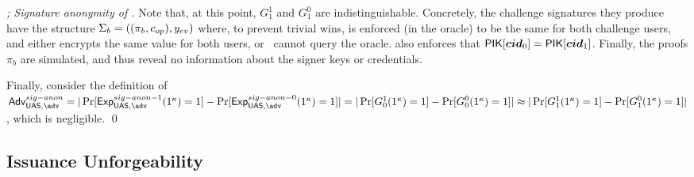 \begin{proof}[; Signature anonymity of \CUASGen]
  Note that, at this point, $G_1^1$ and $G_1^0$ are indistinguishable.
  Concretely, the challenge signatures they produce have the structure $\Sigma_b =
  ((\pi_b,c_{op}),y_{ev})$ where, to prevent trivial wins, \yeval is enforced
  (in the \SIGN oracle) to be the same for both challenge users, and \cinsp
  either encrypts the same value for both users, or \adv~cannot query the \OPEN
  oracle. \SIGN also enforces that $\mathsf{P}\mathsf{IK}[\boldsymbol{cid}_0] = \mathsf{P}\mathsf{IK}[\boldsymbol{cid}_1]$. Finally,
  the proofs $\pi_b$ are simulated, and thus reveal no information about the
  signer keys or credentials.

  Finally, consider the definition of $\AdvSigAnon=|\Pr\lbrack
  \ExpSigAnono(1^\secpar)=1\rbrack-\Pr\lbrack\ExpSigAnonz(1^\secpar)=1\rbrack|
  = |\Pr\lbrack G_0^1(1^\secpar)=1\rbrack-\Pr\lbrack
  G_0^0(1^\secpar)=1\rbrack| \approx
  |\Pr\lbrack G_1^1(1^\secpar)=1\rbrack-\Pr\lbrack
  G_1^0(1^\secpar)=1\rbrack|$, which is negligible.
  \qed
\end{proof}

\subsection{Issuance Unforgeability}

